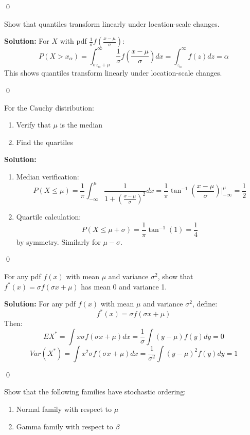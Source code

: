 \qed
\begin{problembox}
Show that quantiles transform linearly under location-scale changes.
\end{problembox}

\noindent\textbf{Solution:}
For $X$ with pdf $\frac{1}{\sigma}f\left(\frac{x-\mu}{\sigma}\right)$:
\[
P(X > x_\alpha) = \int_{\sigma z_\alpha + \mu}^\infty \frac{1}{\sigma}f\left(\frac{x-\mu}{\sigma}\right)dx = \int_{z_\alpha}^\infty f(z)dz = \alpha
\]
This shows quantiles transform linearly under location-scale changes.


\qed
\begin{problembox}
For the Cauchy distribution:
\begin{enumerate}[label=(\alph*)]
\item Verify that $\mu$ is the median
\item Find the quartiles
\end{enumerate}
\end{problembox}

\noindent\textbf{Solution:}
\begin{enumerate}[label=(\alph*)]
\item Median verification:
\[
P(X \leq \mu) = \frac{1}{\pi}\int_{-\infty}^\mu \frac{1}{1+\left(\frac{x-\mu}{\sigma}\right)^2}dx = \frac{1}{\pi}\tan^{-1}\left(\frac{x-\mu}{\sigma}\right)\Big|_{-\infty}^\mu = \frac{1}{2}
\]

\item Quartile calculation:
\[
P(X \leq \mu + \sigma) = \frac{1}{\pi}\tan^{-1}(1) = \frac{1}{4}
\]
by symmetry. Similarly for $\mu - \sigma$.
\end{enumerate}


\qed
\begin{problembox}
For any pdf $f(x)$ with mean $\mu$ and variance $\sigma^2$, show that $f^*(x) = \sigma f(\sigma x + \mu)$ has mean 0 and variance 1.
\end{problembox}

\noindent\textbf{Solution:}
For any pdf $f(x)$ with mean $\mu$ and variance $\sigma^2$, define:
\[
f^*(x) = \sigma f(\sigma x + \mu)
\]
Then:
\[
EX^* = \int x\sigma f(\sigma x + \mu)dx = \frac{1}{\sigma}\int (y-\mu)f(y)dy = 0
\]
\[
Var(X^*) = \int x^2\sigma f(\sigma x + \mu)dx = \frac{1}{\sigma^2}\int (y-\mu)^2f(y)dy = 1
\]


\qed
\begin{problembox}
Show that the following families have stochastic ordering:
\begin{enumerate}[label=(\alph*)]
\item Normal family with respect to $\mu$
\item Gamma family with respect to $\beta$
\end{enumerate}
\end{problembox}

